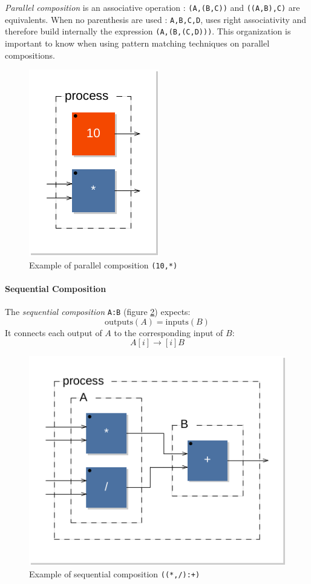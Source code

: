 \emph{Parallel composition} is an associative operation : \lstinline$(A,(B,C))$ and \lstinline$((A,B),C)$ are equivalents. When no parenthesis are used : \lstinline'A,B,C,D', \faust uses right associativity and therefore build internally the expression \lstinline$(A,(B,(C,D)))$. This organization is important to know when using pattern matching techniques on parallel compositions. 

\begin{figure}[h]
\centering
\includegraphics[scale=0.7]{images/par1}
\caption{Example of parallel composition  \lstinline'(10,*)'}
\label{figure-par1}
\end{figure}


\paragraph{Sequential Composition}
The \emph{sequential composition}  \lstinline$A:B$ (figure \ref{figure-seq1}) expects:
\begin{equation}
\mathrm{outputs}(A)=\mathrm{inputs}(B)
\end{equation}  
It connects each output of  $A$ to the corresponding input of $B$: 
\begin{equation}
A[i]\rightarrow[i]B
\end{equation}  

\begin{figure}[h]
\centering 
\includegraphics[scale=0.7]{images/seq1}
\caption{Example of sequential composition  \lstinline'((*,/):+)' } 
\label{figure-seq1}
\end{figure}

